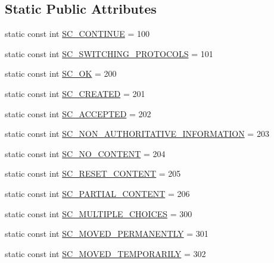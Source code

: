 \subsection*{Static Public Attributes}
\begin{DoxyCompactItemize}
\item 
static const int \hyperlink{class_http_servlet_response_a84380b3dab40453834a6ed5b2a779ae3}{S\+C\+\_\+\+C\+O\+N\+T\+I\+N\+UE} = 100
\item 
static const int \hyperlink{class_http_servlet_response_a4851e3811e6263c5d60d617c15c1e245}{S\+C\+\_\+\+S\+W\+I\+T\+C\+H\+I\+N\+G\+\_\+\+P\+R\+O\+T\+O\+C\+O\+LS} = 101
\item 
static const int \hyperlink{class_http_servlet_response_a7a1fdf58027ff5bafd8b7df7f1d2cb76}{S\+C\+\_\+\+OK} = 200
\item 
static const int \hyperlink{class_http_servlet_response_a0bf1ae1f639fe1100e0bb01e2040ecb3}{S\+C\+\_\+\+C\+R\+E\+A\+T\+ED} = 201
\item 
static const int \hyperlink{class_http_servlet_response_ae9bcf5c1c8e7d2534ac8f923238f2dcc}{S\+C\+\_\+\+A\+C\+C\+E\+P\+T\+ED} = 202
\item 
static const int \hyperlink{class_http_servlet_response_a5fc885352ec49e23e39e54f4f5db6a46}{S\+C\+\_\+\+N\+O\+N\+\_\+\+A\+U\+T\+H\+O\+R\+I\+T\+A\+T\+I\+V\+E\+\_\+\+I\+N\+F\+O\+R\+M\+A\+T\+I\+ON} = 203
\item 
static const int \hyperlink{class_http_servlet_response_add66436f385022cd20a67f6e658ff3ab}{S\+C\+\_\+\+N\+O\+\_\+\+C\+O\+N\+T\+E\+NT} = 204
\item 
static const int \hyperlink{class_http_servlet_response_a90e315b315e862855075239a340b05b9}{S\+C\+\_\+\+R\+E\+S\+E\+T\+\_\+\+C\+O\+N\+T\+E\+NT} = 205
\item 
static const int \hyperlink{class_http_servlet_response_af484a6665ff90049555cdd628420b89e}{S\+C\+\_\+\+P\+A\+R\+T\+I\+A\+L\+\_\+\+C\+O\+N\+T\+E\+NT} = 206
\item 
static const int \hyperlink{class_http_servlet_response_a515985513048e4c49fc86b93b91cf40b}{S\+C\+\_\+\+M\+U\+L\+T\+I\+P\+L\+E\+\_\+\+C\+H\+O\+I\+C\+ES} = 300
\item 
static const int \hyperlink{class_http_servlet_response_a0e98cfeead6374c8790edb762ad59b44}{S\+C\+\_\+\+M\+O\+V\+E\+D\+\_\+\+P\+E\+R\+M\+A\+N\+E\+N\+T\+LY} = 301
\item 
static const int \hyperlink{class_http_servlet_response_a0309e64aabf461686b3db650cfa10c02}{S\+C\+\_\+\+M\+O\+V\+E\+D\+\_\+\+T\+E\+M\+P\+O\+R\+A\+R\+I\+LY} = 302

\end{DoxyCompactItemize}
